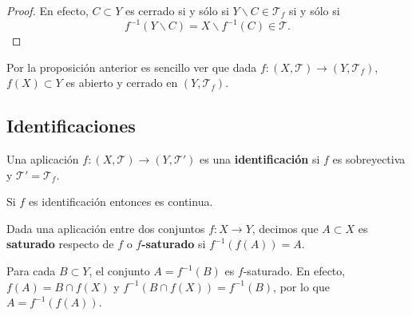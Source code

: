 \begin{proof}
En efecto, $\displaystyle C \subset Y $ es cerrado si y sólo si $\displaystyle Y\backslash C\in \mathcal{T}_{f} $ si y sólo si
\[f^{-1}\left(Y \backslash C\right)= X \backslash f^{-1}\left(C\right)\in \mathcal{T} .\]
\end{proof}
\begin{observation}
Por la proposición anterior es sencillo ver que dada $\displaystyle f : \left(X, \mathcal{T}\right)\to \left(Y, \mathcal{T}_{f}\right) $, $\displaystyle f\left(X\right)\subset Y $ es abierto y cerrado en $\displaystyle \left(Y, \mathcal{T}_{f}\right) $. 
\end{observation}

\subsection{Identificaciones}

\begin{definition}[Identificación]
Una aplicación $\displaystyle f : \left(X, \mathcal{T}\right)\to \left(Y, \mathcal{T}'\right) $ es una \textbf{identificación} si $\displaystyle f $ es sobreyectiva y $\displaystyle \mathcal{T}' = \mathcal{T}_{f} $. 
\end{definition}
\begin{observation}
Si $\displaystyle f $ es identificación entonces es continua.
\end{observation}
\begin{definition}
Dada una aplicación entre dos conjuntos $\displaystyle f : X \to Y $, decimos que $\displaystyle A \subset X $ es \textbf{saturado} respecto de $\displaystyle f $ o \textbf{$\displaystyle f $-saturado} si $\displaystyle f^{-1}\left(f\left(A\right)\right)=A $. 
\end{definition}

\begin{observation}
Para cada $\displaystyle B \subset Y $, el conjunto $\displaystyle A = f^{-1}\left(B\right) $ es $\displaystyle f $-saturado. En efecto, $\displaystyle f\left(A\right)=B \cap f\left(X\right) $ y $\displaystyle f^{-1}\left(B \cap f\left(X\right)\right)=f^{-1}\left(B\right) $, por lo que $\displaystyle A = f^{-1}\left(f\left(A\right)\right) $. 
\end{observation}

